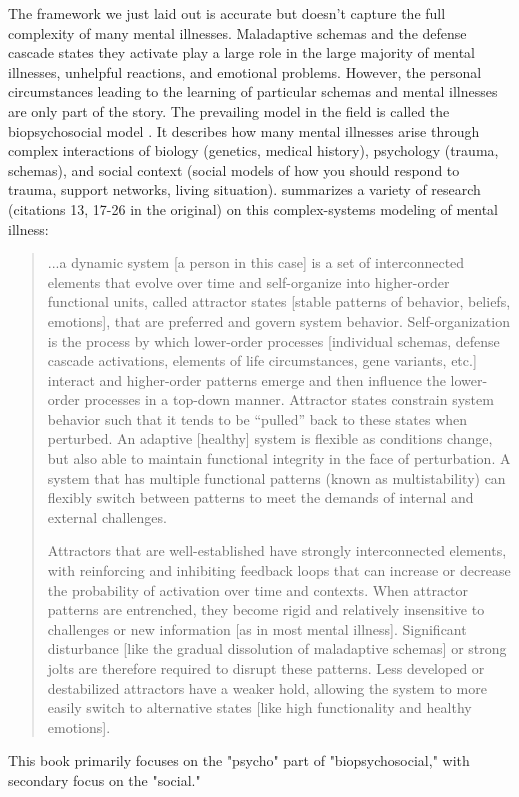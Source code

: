 \documentclass[12pt,letterpaper]{book}
\begin{document}
The framework we just laid out is accurate but doesn't capture the full complexity of many mental illnesses. Maladaptive schemas and the defense cascade states they activate play a large role in the large majority of mental illnesses, unhelpful reactions, and emotional problems. However, the personal circumstances leading to the learning of particular schemas and mental illnesses are only part of the story. The prevailing model in the field is called the biopsychosocial model \cite{engel1977need}. It describes how many mental illnesses arise through complex interactions of biology (genetics, medical history), psychology (trauma, schemas), and social context (social models of how you should respond to trauma, support networks, living situation). \textcite{hayes2020complex} summarizes a variety of research (citations 13, 17-26 in the original) on this complex-systems modeling of mental illness:
\begin{quotation}
	...a dynamic system [a person in this case] is a set of interconnected elements that evolve over time and self-organize into higher-order functional units, called attractor states [stable patterns of behavior, beliefs, emotions], that are preferred and govern system behavior. Self-organization is the process by which lower-order processes [individual schemas, defense cascade activations, elements of life circumstances, gene variants, etc.] interact and higher-order patterns emerge and then influence the lower-order processes in a top-down manner. Attractor states constrain system behavior such that it tends to be “pulled” back to these states when perturbed. An adaptive [healthy] system is flexible as conditions change, but also able to maintain functional integrity in the face of perturbation. A system that has multiple functional patterns (known as multistability) can flexibly switch between patterns to meet the demands of internal and external challenges.
	
	Attractors that are well-established have strongly interconnected elements, with reinforcing and inhibiting feedback loops that can increase or decrease the probability of activation over time and contexts. When attractor patterns are entrenched, they become rigid and relatively insensitive to challenges or new information [as in most mental illness]. Significant disturbance [like the gradual dissolution of maladaptive schemas] or strong jolts are therefore required to disrupt these patterns. Less developed or destabilized attractors have a weaker hold, allowing the system to more easily switch to alternative states [like high functionality and healthy emotions].
\end{quotation}
This book primarily focuses on the "psycho" part of "biopsychosocial," with secondary focus on the "social."
\end{document}
